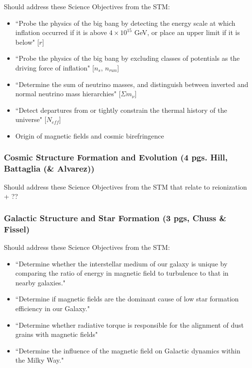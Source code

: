 \documentclass[12pt]{article}
\begin{document}
        Should address these Science Objectives from the STM:
        \begin{itemize}
        \item ``Probe the physics of the big bang by detecting the energy scale at which inflation occurred if it is above $4\times10^{15}$ GeV, or place an upper limit if it is below" [$r$]
        \item ``Probe the physics of the big bang by excluding classes of potentials as the driving force of inflation" [$n_s$, $n_{run}$]
        \item ``Determine the sum of neutrino masses, and distinguish between inverted and normal neutrino mass hierarchies" [$\Sigma m_{\nu}$]
        \item ``Detect departures from or tightly constrain the thermal history of the universe" [$N_{eff}$]
        \item Origin of magnetic fields and cosmic birefringence
        \end{itemize} 

\subsubsection{Cosmic Structure Formation and Evolution (4 pgs. Hill, Battaglia (\& Alvarez))}

Should address these Science Objectives from the STM that relate to reionization + ??

\subsubsection{Galactic Structure and Star Formation (3 pgs, Chuss \& Fissel)}

Should address these Science Objectives from the STM:
        \begin{itemize}
        \item ``Determine whether the interstellar medium of our galaxy is unique by comparing the ratio of energy in magnetic field to turbulence to that in nearby galaxies."
        \item ``Determine if magnetic fields are the dominant cause of low star formation efficiency in our Galaxy."
        \item ``Determine whether radiative torque is responsible for the alignment of dust grains with magnetic fields"
        \item ``Determine the influence of the magnetic field on Galactic dynamics within the Milky Way."
        \end{itemize}
\end{document}

